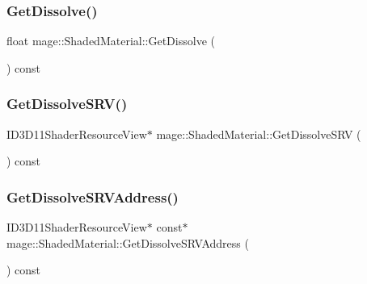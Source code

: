 \hypertarget{structmage_1_1_shaded_material_adff98fa9d3ace697033106e04d09ac98}{}\label{structmage_1_1_shaded_material_adff98fa9d3ace697033106e04d09ac98} 
\subsubsection{\texorpdfstring{Get\+Dissolve()}{GetDissolve()}}
{\footnotesize\ttfamily float mage\+::\+Shaded\+Material\+::\+Get\+Dissolve (\begin{DoxyParamCaption}{ }\end{DoxyParamCaption}) const\hspace{0.3cm}{\ttfamily [noexcept]}}

\hypertarget{structmage_1_1_shaded_material_ac74d2e8849300aa1e54cbce0bf8cbeff}{}\label{structmage_1_1_shaded_material_ac74d2e8849300aa1e54cbce0bf8cbeff} 
\subsubsection{\texorpdfstring{Get\+Dissolve\+S\+R\+V()}{GetDissolveSRV()}}
{\footnotesize\ttfamily I\+D3\+D11\+Shader\+Resource\+View$\ast$ mage\+::\+Shaded\+Material\+::\+Get\+Dissolve\+S\+RV (\begin{DoxyParamCaption}{ }\end{DoxyParamCaption}) const\hspace{0.3cm}{\ttfamily [noexcept]}}

\hypertarget{structmage_1_1_shaded_material_aa114be8c5d55096554cf75fdba75ab2d}{}\label{structmage_1_1_shaded_material_aa114be8c5d55096554cf75fdba75ab2d} 
\subsubsection{\texorpdfstring{Get\+Dissolve\+S\+R\+V\+Address()}{GetDissolveSRVAddress()}}
{\footnotesize\ttfamily I\+D3\+D11\+Shader\+Resource\+View$\ast$ const$\ast$ mage\+::\+Shaded\+Material\+::\+Get\+Dissolve\+S\+R\+V\+Address (\begin{DoxyParamCaption}{ }\end{DoxyParamCaption}) const\hspace{0.3cm}{\ttfamily [noexcept]}}


